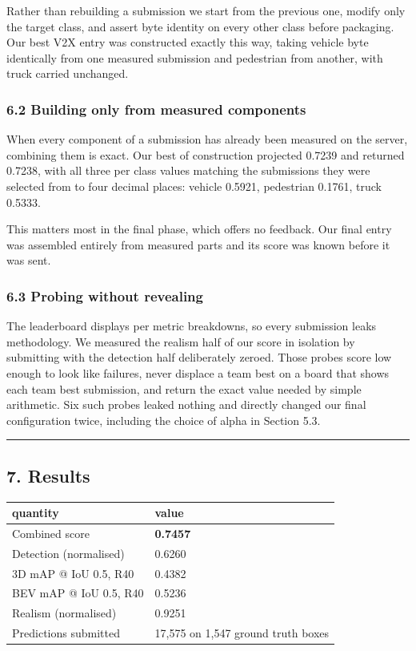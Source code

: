 \documentclass[
  10pt,
]{article}
\newcounter{none} %
\begin{document}
Rather than rebuilding a submission we start from the previous one,
modify only the target class, and assert byte identity on every other
class before packaging. Our best V2X entry was constructed exactly this
way, taking vehicle byte identically from one measured submission and
pedestrian from another, with truck carried unchanged.

\subsubsection{6.2 Building only from measured
components}\label{building-only-from-measured-components}

When every component of a submission has already been measured on the
server, combining them is exact. Our best of construction projected
0.7239 and returned 0.7238, with all three per class values matching the
submissions they were selected from to four decimal places: vehicle
0.5921, pedestrian 0.1761, truck 0.5333.

This matters most in the final phase, which offers no feedback. Our
final entry was assembled entirely from measured parts and its score was
known before it was sent.

\subsubsection{6.3 Probing without
revealing}\label{probing-without-revealing}

The leaderboard displays per metric breakdowns, so every submission
leaks methodology. We measured the realism half of our score in
isolation by submitting with the detection half deliberately zeroed.
Those probes score low enough to look like failures, never displace a
team best on a board that shows each team best submission, and return
the exact value needed by simple arithmetic. Six such probes leaked
nothing and directly changed our final configuration twice, including
the choice of alpha in Section 5.3.

\begin{center}\rule{0.5\linewidth}{0.5pt}\end{center}

\subsection{7. Results}\label{results}

{\def\LTcaptype{none} %
\begin{longtable}[]{@{}ll@{}}
\toprule\noalign{}
quantity & value \\
\midrule\noalign{}
\endhead
\bottomrule\noalign{}
\endlastfoot
Combined score & \textbf{0.7457} \\
Detection (normalised) & 0.6260 \\
3D mAP @ IoU 0.5, R40 & 0.4382 \\
BEV mAP @ IoU 0.5, R40 & 0.5236 \\
Realism (normalised) & 0.9251 \\
Predictions submitted & 17,575 on 1,547 ground truth boxes \\
\end{longtable}
}
\end{document}
